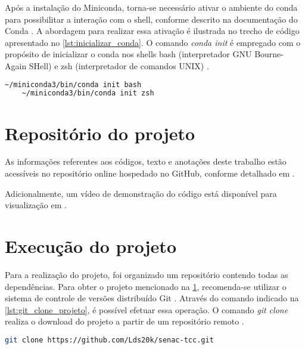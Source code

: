 Após a instalação do Miniconda, torna-se necessário ativar o ambiente do conda para possibilitar a interação com o shell, conforme descrito na documentação do Conda \cite{conda_documentation}. A abordagem para realizar essa ativação é ilustrada no trecho de código apresentado no \cref{lst:inicializar_conda}. O comando \emph{conda init} é empregado com o propósito de inicializar o conda nos shells bash (interpretador GNU Bourne-Again SHell) e zsh (interpretador de comandos UNIX) \cite{debian_man_pages,conda_documentation}.

\begin{lstlisting}[caption={Trecho de código com comando para inicializar o Miniconda \cite{miniconda_documentation}},label={lst:inicializar_conda},language=Bash,showstringspaces=false]
    ~/miniconda3/bin/conda init bash
    ~/miniconda3/bin/conda init zsh
\end{lstlisting}

\section{Repositório do projeto}
\label{sec:repositorio_projeto}

As informações referentes aos códigos, texto e anotações deste trabalho estão acessíveis no repositório online hospedado no GitHub, conforme detalhado em .

Adicionalmente, um vídeo de demonstração do código está disponível para visualização em .

\section{Execução do projeto}

Para a realização do projeto, foi organizado um repositório contendo todas as dependências. Para obter o projeto mencionado na \cref{sec:repositorio_projeto}, recomenda-se utilizar o sistema de controle de versões distribuído Git \cite{git_page}. Através do comando indicado na \cref{lst:git_clone_projeto}, é possível efetuar essa operação. O comando \emph{git clone} realiza o download do projeto a partir de um repositório remoto \cite{git_clone}.

\begin{lstlisting}[caption={Trecho de código com comando do git para baixar o projeto},label={lst:git_clone_projeto},language=Bash,showstringspaces=false]
    git clone https://github.com/Lds20k/senac-tcc.git
\end{lstlisting}


